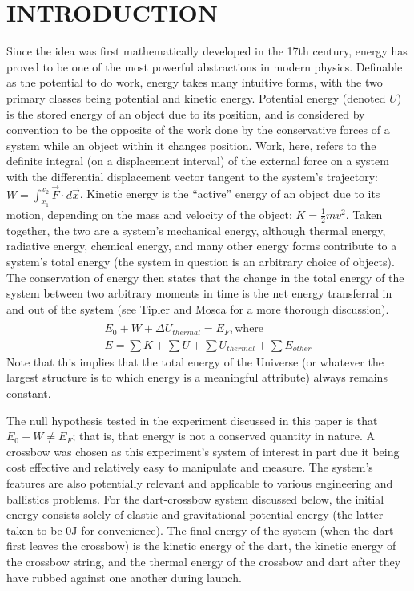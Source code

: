 \documentclass[twocolumn, 10pt]{article}
\begin{document}
\section*{INTRODUCTION}
\hspace{\parindent}	Since the idea was first mathematically developed in the 17th century, energy has proved to be one of the most powerful abstractions in modern physics. Definable as the potential to do work, energy takes many intuitive forms, with the two primary classes being potential and kinetic energy. Potential energy (denoted $U$) is the stored energy of an object due to its position, and is considered by convention to be the opposite of the work done by the conservative forces of a system while an object within it changes position. Work, here, refers to the definite integral (on a displacement interval) of the external force on a system with the differential displacement vector tangent to the system’s trajectory: $W=\int_{x_1}^{x_2} \vec{F}\cdot d\vec{x}$. Kinetic energy is the “active” energy of an object due to its motion, depending on the mass and velocity of the object: $K=\frac{1}{2}mv^2$. Taken together, the two are a system’s mechanical energy, although thermal energy, radiative energy, chemical energy, and many other energy forms contribute to a system’s total energy (the system in question is an arbitrary choice of objects). The conservation of energy then states that the change in the total energy of the system between two arbitrary moments in time is the net energy transferral in and out of the system (see Tipler and Mosca for a more thorough discussion).
\vspace{-5pt}
\begin{gather*}
    \\ E_0 + W + \Delta U_{thermal}= E_F, \text{where}
    \\ E = \sum K + \sum U + \sum U_{thermal} + \sum E_{other}
\end{gather*}
Note that this implies that the total energy of the Universe (or whatever the largest structure is to which energy is a meaningful attribute) always remains constant.

The null hypothesis tested in the experiment discussed in this paper is that $E_0 + W \neq E_F$; that is, that energy is not a conserved quantity in nature. A crossbow was chosen as this experiment’s system of interest in part due it being cost effective and relatively easy to manipulate and measure. The system’s features are also potentially relevant and applicable to various engineering and ballistics problems. For the dart-crossbow system discussed below, the initial energy consists solely of elastic and gravitational potential energy (the latter taken to be 0J for convenience). The final energy of the system (when the dart first leaves the crossbow) is the kinetic energy of the dart, the kinetic energy of the crossbow string, and the thermal energy of the crossbow and dart after they have rubbed against one another during launch.
\end{document}
